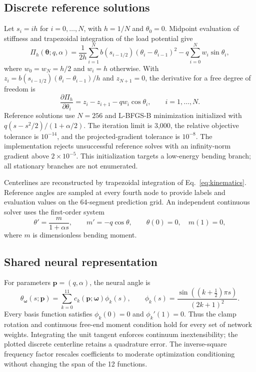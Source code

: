 \documentclass[11pt,a4paper]{article}
\begin{document}
\subsection{Discrete reference solutions}
Let $s_i=ih$ for $i=0,\ldots,N$, with $h=1/N$ and $\theta_0=0$. Midpoint evaluation of stiffness and trapezoidal integration of the load potential give
\begin{equation}
 \Pi_h(\boldsymbol\theta;q,\alpha)
 =\frac{1}{2h}\sum_{i=1}^N b(s_{i-1/2})(\theta_i-\theta_{i-1})^2
 -q\sum_{i=0}^N w_i\sin\theta_i,
 \label{eq:discrete}
\end{equation}
where $w_0=w_N=h/2$ and $w_i=h$ otherwise. With $z_i=b(s_{i-1/2})(\theta_i-\theta_{i-1})/h$ and $z_{N+1}=0$, the derivative for a free degree of freedom is
\begin{equation}
 \frac{\partial\Pi_h}{\partial\theta_i}=z_i-z_{i+1}-q w_i\cos\theta_i,
 \qquad i=1,\ldots,N.
 \label{eq:gradient}
\end{equation}
Reference solutions use $N=256$ and L-BFGS-B minimization initialized with $q(s-s^2/2)/(1+\alpha/2)$. The iteration limit is 3,000, the relative objective tolerance is $10^{-14}$, and the projected-gradient tolerance is $10^{-8}$. The implementation rejects unsuccessful reference solves with an infinity-norm gradient above $2\times10^{-5}$. This initialization targets a low-energy bending branch; all stationary branches are not enumerated.

Centerlines are reconstructed by trapezoidal integration of Eq.~\eqref{eq:kinematics}. Reference angles are sampled at every fourth node to provide labels and evaluation values on the 64-segment prediction grid. An independent continuous solver uses the first-order system
\begin{equation}
 \theta'=\frac{m}{1+\alpha s},\qquad m'=-q\cos\theta,
 \qquad \theta(0)=0,\quad m(1)=0,
 \label{eq:bvp}
\end{equation}
where $m$ is dimensionless bending moment.

\subsection{Shared neural representation}
For parameters $\mathbf p=(q,\alpha)$, the neural angle is
\begin{equation}
 \theta_{\boldsymbol\omega}(s;\mathbf p)
 =\sum_{k=0}^{11} c_k(\mathbf p;\boldsymbol\omega)\phi_k(s),\qquad
 \phi_k(s)=\frac{\sin((k+\tfrac12)\pi s)}{(2k+1)^2}.
 \label{eq:basis}
\end{equation}
Every basis function satisfies $\phi_k(0)=0$ and $\phi_k'(1)=0$. Thus the clamp rotation and continuous free-end moment condition hold for every set of network weights. Integrating the unit tangent enforces continuum inextensibility; the plotted discrete centerline retains a quadrature error. The inverse-square frequency factor rescales coefficients to moderate optimization conditioning without changing the span of the 12 functions.
\end{document}
